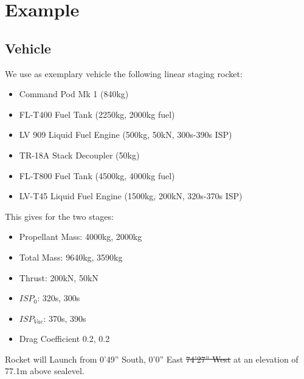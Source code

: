 \documentclass[11pt]{report}
\begin{document}
\chapter{Example}

\section{Vehicle}

We use as exemplary vehicle the following linear staging rocket:

\begin{itemize}
\item Command Pod Mk 1 (840kg)
\item FL-T400 Fuel Tank (2250kg, 2000kg fuel)
\item LV 909 Liquid Fuel Engine (500kg, 50kN, 300s-390s ISP)
\item TR-18A Stack Decoupler (50kg)
\item FL-T800 Fuel Tank (4500kg, 4000kg fuel)
\item LV-T45 Liquid Fuel Engine (1500kg, 200kN, 320s-370s ISP)
\end{itemize}

This gives for the two stages:

\begin{itemize}
\item Propellant Mass: 4000kg, 2000kg
\item Total Mass: 9640kg, 3590kg
\item Thrust: 200kN, 50kN
\item $ISP_0$: 320s, 300s
\item $ISP_{Vac}$: 370s, 390s
\item Drag Coefficient 0.2, 0.2
\end{itemize}

Rocket will Launch from 0'49'' South, 0'0''
East \sout{74'27'' West} at an elevation of 77.1m above
sealevel.
\end{document}
